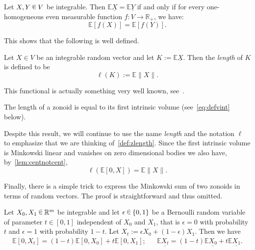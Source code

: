 \documentclass[AHL, Unicode, longabstracts, published]{cedram}
\newcommand{\R}{\mathbb{R}}
\newcommand{\EE}{\mathbb{E}}
\newcommand{\seg}{\underline}
\newcommand*\randin{
\mathchoice {\raisebox{-.35ex}{$\displaystyle{^\subset}$}\mkern-11.5mu\raisebox{+.45ex}{$\displaystyle{_\subset}$}} {\mkern+1mu\raisebox{-.27ex}{$\textstyle{^\subset}$}\mkern-11.7mu\raisebox{+.45ex}{$\textstyle{_\subset}$}} {\raisebox{.35ex}{$\scriptstyle\subset$}\mkern-14mu\raisebox{-.15ex}{$\scriptstyle\subset$}} {\raisebox{.3ex}{$\scriptscriptstyle\subset$}\mkern-13.5mu\raisebox{-.10ex}{$\scriptscriptstyle\subset$}}}
\begin{document}
\begin{prop}\label{prop:zoneq}
Let $X,Y\,\randin\, V$ be integrable. Then $\EE\seg{X}=\EE\seg{Y}$ if and only if for every one-homogeneous even measurable function $f: V\to \R_+$, we have:
\begin{equation*}
\EE \left[f(X)\right]=\EE \left[f(Y)\right].
\end{equation*}
\end{prop}

This shows that the following is well defined.

\begin{defi}\label{def:zlength}
Let $X\in V$ be an integrable random vector and let $K:=\EE\seg{X}$. Then the \emph{length} of $K$ is defined to be
\begin{equation*}
\ell(K):=\EE\|X\|.
\end{equation*}
\end{defi}

This functional is actually something very well known, see~\cite[Theorem~5.2]{ZA}.
\begin{lemm}
The length of a zonoid is equal to its first intrinsic volume (see~\eqref{eq:defvint} below).
\end{lemm}

Despite this result, we will continue to use the name \emph{length} and the notation $\ell$ to emphasize that we are thinking of~\cref{def:zlength}. Since the first intrinsic volume is Minkowski linear and vanishes on zero dimensional bodies we also have, by~\cref{lem:centnotcent},
\begin{equation}\label{eq:lengthnorm}
\ell(\EE[0,X])=\EE\|X\|.
\end{equation}

Finally, there is a simple trick to express the Minkowski sum of two zonoids in terms of random vectors. The proof is straightforward and thus omitted.

\begin{lemm}
Let $X_0,X_1\,\randin\,\R^m$ be integrable and let $\epsilon\,\randin\,\{0,1\}$ be a Bernoulli random variable of parameter $t\in[0,1]$ independent of $X_0$ and $X_1$, that is $\epsilon=0$ with probability $t$ and $\epsilon=1$ with probability $1-t$. Let $X_t:=\epsilon X_0 + (1-\epsilon)X_1$. Then we have
\begin{align*}
\EE[0,X_t]=(1-t)\EE[0,X_0]+t\EE[0,X_1]; && \EE\seg{X_t}=(1-t)\EE\seg{X_0}+t\EE\seg{X_1}.
\end{align*}
\end{lemm}
\end{document}
